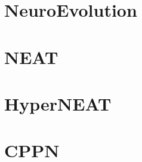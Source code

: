 \documentclass[11pt, a4paper]{article}
\begin{document}
\author{Mads Anthony}
\section{NeuroEvolution}
\section{NEAT}
\section{HyperNEAT}
\section{CPPN}
\end{document}
